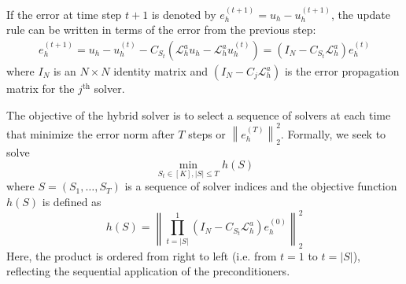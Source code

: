 \documentclass{article} %
\begin{document}

If the error at time step $t + 1$ is denoted by $e^{(t + 1)}_h = u_h - u^{\left(t + 1\right)}_h$, the update rule can be written in terms of the error from the previous step:
\begin{align*}
    e^{(t + 1)}_h = u_h -  u^{\left(t\right)}_h -C_{S_t}\left(\mathcal{L}_h^au_h - \mathcal{L}_h^au^{\left(t\right)}_h\right) = \left(I_N - C_{S_t}\mathcal{L}_h^a\right)e^{(t)}_h 
\end{align*}
where $I_N$ is an $N \times N$ identity matrix and $\left(I_N - C_{j}\mathcal{L}_h^a\right)$ is the error propagation matrix for the $j^{\text{th}}$ solver.


The objective of the hybrid solver is to select a sequence of solvers at each time that minimize the error norm after $T$ steps or $\left\|e^{(T)}_h\right\|_2^2$. Formally, we seek to solve 
\begin{equation} \label{eq:errorobjective}
    \min_{S_t \in [K], |S| \leq T} h(S)
\end{equation}
where $S = (S_1, \dots, S_T)$ is a sequence of solver indices and the objective function $h(S)$ is defined as
\begin{equation} \label{eq:errorobjective2}
    h(S) = \left\|\prod_{t = |S|}^1\left(I_N - C_{S_t} \mathcal{L}_h^a\right)  e^{(0)}_h \right\|^2_2
\end{equation}
Here, the product is ordered from right to left (i.e. from $t = 1$ to $t = |S|$), reflecting the sequential application of the preconditioners. 

\end{document}
